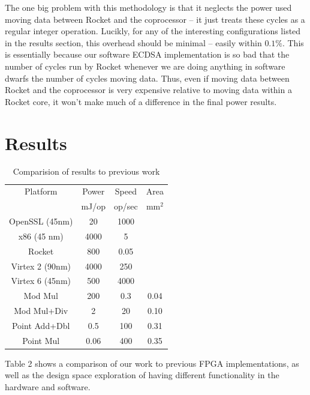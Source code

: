 \documentclass[twocolumn]{article}
\begin{document}
The one big problem with this methodology is that it neglects the
power used moving data between Rocket and the coprocessor -- it just
treats these cycles as a regular integer operation.  Lucikly, for any
of the interesting configurations listed in the results section, this
overhead should be minimal -- easily within $0.1\%$.  This is
essentially because our software ECDSA implementation is so bad that
the number of cycles run by Rocket whenever we are doing anything in
software dwarfs the number of cycles moving data.  Thus, even if
moving data between Rocket and the coprocessor is very expensive
relative to moving data within a Rocket core, it won't make much of a
difference in the final power results.

\section{Results}

\begin{table}[ht]
  \begin{center}
    \begin{tabular}{c|ccc}
      Platform        & Power & Speed  & Area \\
                      & mJ/op & op/sec & mm$^2$ \\
      \hline
      OpenSSL (45nm)  & 20    & 1000   &      \\
      x86 (45 nm)     & 4000  & 5      &      \\
      Rocket          & 800   & 0.05   &      \\
      Virtex 2 (90nm) & 4000  & 250    &      \\
      Virtex 6 (45nm) & 500   & 4000   &      \\
      \hline
      Mod Mul         & 200   & 0.3    & 0.04 \\
      Mod Mul+Div     & 2     & 20     & 0.10 \\
      Point Add+Dbl   & 0.5   & 100    & 0.31 \\
      Point Mul       & 0.06  & 400    & 0.35 \\
    \end{tabular}
  \end{center}

  \caption{Comparision of results to previous work
    \label{results}}
\end{table}

Table 2 shows a comparison of our work to previous FPGA implementations, as well
as the design space exploration of having different functionality in the hardware 
and software. 
\end{document}
